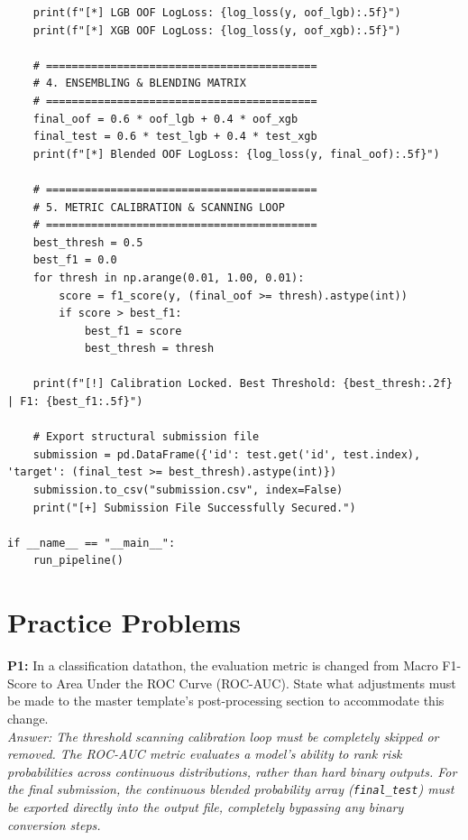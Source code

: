 \documentclass{article}
\begin{document}
\begin{verbatim}
    print(f"[*] LGB OOF LogLoss: {log_loss(y, oof_lgb):.5f}")
    print(f"[*] XGB OOF LogLoss: {log_loss(y, oof_xgb):.5f}")

    # ==========================================
    # 4. ENSEMBLING & BLENDING MATRIX
    # ==========================================
    final_oof = 0.6 * oof_lgb + 0.4 * oof_xgb
    final_test = 0.6 * test_lgb + 0.4 * test_xgb
    print(f"[*] Blended OOF LogLoss: {log_loss(y, final_oof):.5f}")

    # ==========================================
    # 5. METRIC CALIBRATION & SCANNING LOOP
    # ==========================================
    best_thresh = 0.5
    best_f1 = 0.0
    for thresh in np.arange(0.01, 1.00, 0.01):
        score = f1_score(y, (final_oof >= thresh).astype(int))
        if score > best_f1:
            best_f1 = score
            best_thresh = thresh

    print(f"[!] Calibration Locked. Best Threshold: {best_thresh:.2f} | F1: {best_f1:.5f}")

    # Export structural submission file
    submission = pd.DataFrame({'id': test.get('id', test.index), 'target': (final_test >= best_thresh).astype(int)})
    submission.to_csv("submission.csv", index=False)
    print("[+] Submission File Successfully Secured.")

if __name__ == "__main__":
    run_pipeline()
\end{verbatim}

\newpage
\section{Practice Problems}

\textbf{P1:} In a classification datathon, the evaluation metric is changed from Macro F1-Score to Area Under the ROC Curve (ROC-AUC). State what adjustments must be made to the master template's post-processing section to accommodate this change.
\\
\textit{Answer: The threshold scanning calibration loop must be completely skipped or removed. The ROC-AUC metric evaluates a model's ability to rank risk probabilities across continuous distributions, rather than hard binary outputs. For the final submission, the continuous blended probability array (\texttt{final\_test}) must be exported directly into the output file, completely bypassing any binary conversion steps.}
\end{document}

